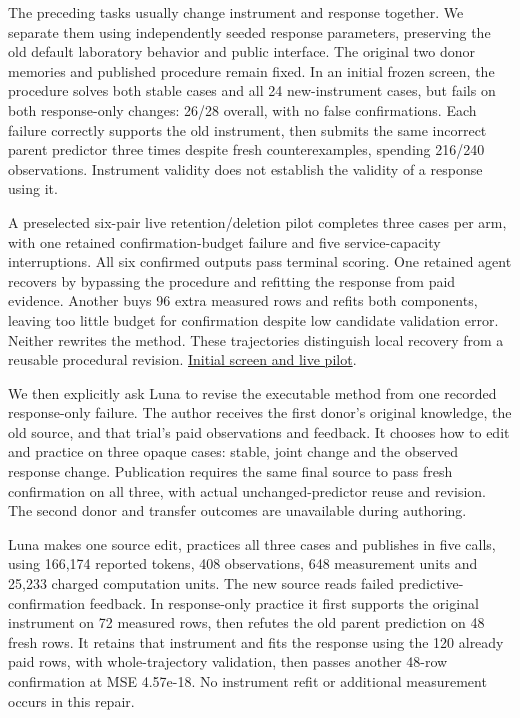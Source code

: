 \documentclass[11pt,a4paper]{article}
\begin{document}
The preceding tasks usually change instrument and response together. We separate
them using independently seeded response parameters, preserving the old default
laboratory behavior and public interface. The original two donor memories and
published procedure remain fixed. In an initial frozen screen, the procedure
solves both stable cases and all 24 new-instrument cases, but fails on both
response-only changes: 26/28 overall, with no false confirmations. Each failure
correctly supports the old instrument, then submits the same incorrect parent
predictor three times despite fresh counterexamples, spending 216/240 observations.
Instrument validity does not establish the validity of a response using it.


A preselected six-pair live retention/deletion pilot completes three cases per arm,
with one retained confirmation-budget failure and five service-capacity interruptions.
All six confirmed outputs pass terminal scoring. One retained agent recovers by
bypassing the procedure and refitting the response from paid evidence. Another
buys 96 extra measured rows and refits both components, leaving too little budget
for confirmation despite low candidate validation error. Neither rewrites the
method. These trajectories distinguish local recovery from a reusable procedural
revision. \hyperlink{artifact-69}{Initial screen and live pilot}.


We then explicitly ask Luna to revise the executable method from one recorded
response-only failure. The author receives the first donor's original knowledge,
the old source, and that trial's paid observations and feedback. It chooses how
to edit and practice on three opaque cases: stable, joint change and the observed
response change. Publication requires the same final source to pass fresh
confirmation on all three, with actual unchanged-predictor reuse and revision.
The second donor and transfer outcomes are unavailable during authoring.


Luna makes one source edit, practices all three cases and publishes in five calls,
using 166,174 reported tokens, 408 observations, 648 measurement units and 25,233
charged computation units. The new source reads failed predictive-confirmation
feedback. In response-only practice it first supports the original instrument
on 72 measured rows, then refutes the old parent prediction on 48 fresh rows.
It retains that instrument and fits the response using the 120 already paid rows,
with whole-trajectory validation, then passes another 48-row confirmation at
MSE 4.57e-18. No instrument refit or additional measurement occurs in this repair.
\end{document}

